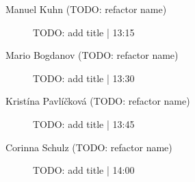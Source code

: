 \begin{symposium}
\begin{description}
                \item [Manuel Kuhn  (TODO: refactor name)] TODO: add title \textcolor{mygray}{ | 13:15}    
                
                \item [Mario Bogdanov (TODO: refactor name)] TODO: add title \textcolor{mygray}{ | 13:30}    
                
                \item [Kristína Pavlíčková (TODO: refactor name)] TODO: add title \textcolor{mygray}{ | 13:45}    
                
                \item [Corinna Schulz (TODO: refactor name)] TODO: add title \textcolor{mygray}{ | 14:00}    
                
            \end{description} 
            \end{symposium}
            